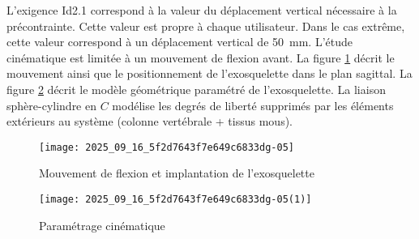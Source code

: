 L'exigence Id2.1 correspond à la valeur du déplacement vertical nécessaire à la précontrainte. Cette valeur est propre à chaque utilisateur. Dans le cas extrême, cette valeur correspond à un déplacement vertical de \SI{50}{mm}. L'étude cinématique est limitée à un mouvement de flexion avant. La figure \ref{ccs_mp_2023_fig_06} décrit le mouvement ainsi que le positionnement de l'exosquelette dans le plan sagittal. La figure \ref{ccs_mp_2023_fig_07} décrit le modèle géométrique paramétré de l'exosquelette. La liaison sphère-cylindre en $C$ modélise les degrés de liberté supprimés par les éléments extérieurs au système (colonne vertébrale + tissus mous).\\

\ifprof
\begin{corrige}
\end{corrige}
\else
\fi




\begin{figure}[!h]
\centering
\texttt{[image: 2025\_09\_16\_5f2d7643f7e649c6833dg-05]}
\caption{\label{ccs_mp_2023_fig_06}  Mouvement de flexion et implantation de l'exosquelette}
\end{figure}





\begin{figure}[!h]
\centering
\texttt{[image: 2025\_09\_16\_5f2d7643f7e649c6833dg-05(1)]}
\caption{\label{ccs_mp_2023_fig_07} Paramétrage cinématique }
\end{figure}




